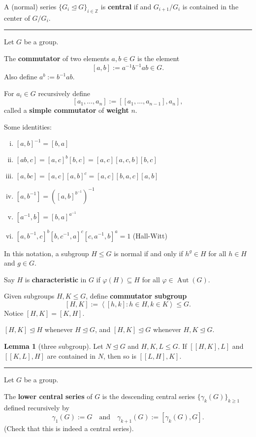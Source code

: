 \documentclass[12pt]{article}
\newcommand{\keyword}[1]{\textbf{#1}}
\newcommand{\sepline}{\rule{\textwidth}{0.4pt}}
\theoremstyle{definition}
\newtheorem{lemma}{Lemma}
\newcommand{\isp}[1]{\quad\text{#1}\quad}
\newcommand{\Z}{\mathbb{Z}}
\renewcommand{\phi}{\varphi}
\newcommand{\<}{\left\langle}
\renewcommand{\>}{\right\rangle}
\newcommand{\seq}{\subseteq}
\newcommand{\teq}{\trianglelefteq}
\DeclareMathOperator{\Aut}{Aut}
\begin{document}
A (normal) series $\{G_i \teq G\}_{i \in \Z}$ is \keyword{central} if and $G_{i+1}/G_i$ is contained in the center of $G/G_i$.

\sepline

Let $G$ be a group.

The \keyword{commutator} of two elements $a, b \in G$ is the element
\[
    [a, b] := a^{-1}b^{-1}ab \in G.
\]
Also define $a^b := b^{-1}ab$.

For $a_i \in G$ recursively define
\[
    [a_1, \dots, a_n] := [[a_1, \dots, a_{n-1}], a_n],
\]
called a \keyword{simple commutator} of \keyword{weight} $n$.

Some identities:
\begin{enumerate}[(i)]
    \item $[a, b]^{-1} = [b, a]$
    \item $[ab, c] = [a, c]^b[b, c] = [a, c][a, c, b][b, c]$
    \item $[a, bc] = [a, c][a, b]^c = [a, c][b, a, c][a, b]$
    \item $[a, b^{-1}] = ([a, b]^{b^{-1}})^{-1}$
    \item $[a^{-1}, b] = [b, a]^{a^{-1}}$
    \item $[a, b^{-1}, c]^b[b, c^{-1}, a]^c[c, a^{-1}, b]^a = 1$ (Hall-Witt)
\end{enumerate}


In this notation, a subgroup $H \leq G$ is normal if and only if $h^g \in H$ for all $h \in H$ and $g \in G$.

Say $H$ is \keyword{characteristic} in $G$ if $\phi(H) \seq H$ for all $\phi \in \Aut(G)$.

Given subgroups $H, K \leq G$, define \keyword{commutator subgroup}
\[
    [H, K] := \<[h, k] : h \in H, k \in K\> \leq G.
\]
Notice $[H, K] = [K, H]$.

$[H, K] \teq H$ whenever $H \teq G$, and $[H, K] \teq G$ whenever $H, K \teq G$.

\begin{lemma}[three subgroup]
    Let $N \teq G$ and $H, K, L \leq G$.
    If $[[H, K], L]$ and $[[K, L], H]$ are contained in $N$, then so is $[[L, H], K]$.
\end{lemma}

\sepline

Let $G$ be a group.

The \keyword{lower central series} of $G$ is the descending central series 
$\{\gamma_k(G)\}_{k \geq 1}$ defined recursively by
\[
    \gamma_1(G) := G
    \isp{and}
    \gamma_{k+1}(G) := [\gamma_k(G), G].
\]
(Check that this is indeed a central series).
\end{document}
